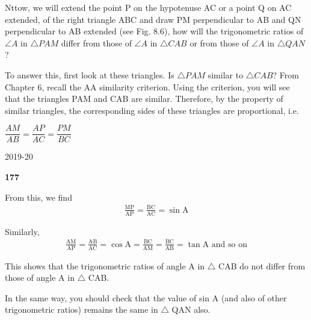 \documentclass[11pt,a4paper]{article}
\begin{document}
\noindent \color{black}
Nttow, we will extend the point P on the hypotenuse AC or a point Q on AC extended, of the right triangle ABC and draw PM perpendicular to AB and QN perpendicular to AB extended (see Fig. 8.6), how will the trigonometric ratios of $\angle A$ in $\triangle PAM$ differ from those of $\angle A$ in $\triangle CAB$ or from those of $\angle A$ in $\triangle QAN$?

\vspace{0.3cm}

\noindent To answer this, first look at these triangles. Is $\triangle PAM$ similar to $\triangle CAB$? From Chapter 6, recall the AA similarity criterion. Using the criterion, you will see that the triangles PAM and CAB are similar. Therefore, by the property of similar triangles, the corresponding sides of these triangles are proportional, i.e.

\begin{center}
    $\dfrac{AM}{AB} = \dfrac{AP}{AC} = \dfrac{PM}{BC}$
\end{center}
\vfill
\begin{center}
2019-20
\end{center}

\newpage


 \hfill {\textbf{177}}

\vspace{-0.5cm}
\noindent{\color{cyan}\rule{\textwidth}{0.5pt}}

\vspace{-0.3cm}
\noindent From this, we find
\begin{align*}
\frac{\mathrm{MP}}{\mathrm{AP}} = \frac{\mathrm{BC}}{\mathrm{AC}} = \sin \mathrm{A}
\end{align*}

\noindent Similarly,
\begin{align*}
\frac{\mathrm{AM}}{\mathrm{AP}} = \frac{\mathrm{AB}}{\mathrm{AC}} = \cos \mathrm{A} = \frac{\mathrm{BC}}{\mathrm{AM}} = \frac{\mathrm{BC}}{\mathrm{AB}} = \tan \mathrm{A} \text{ and so on}
\end{align*}

\noindent This shows that the trigonometric ratios of angle A in $\triangle$ CAB do not differ from those of angle A in $\triangle$ CAB.

\noindent In the same way, you should check that the value of sin A (and also of other trigonometric ratios) remains the same in $\triangle$ QAN also.
\end{document}
